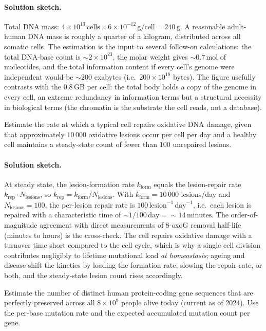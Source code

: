 \paragraph{Solution sketch.} Total DNA mass:
$4 \times 10^{13}\,\text{cells} \times 6 \times 10^{-12}\,\text{g/cell}
= 240\,\text{g}$. A reasonable adult-human DNA mass is roughly a
quarter of a kilogram, distributed across all somatic cells. The
estimation is the input to several follow-on calculations: the total
DNA-base count is $\sim 2 \times 10^{23}$, the molar weight gives
$\sim 0.7\,\text{mol}$ of nucleotides, and the total information
content if every cell's genome were independent would be $\sim 200$
exabytes (i.e.\ $200 \times 10^{18}$ bytes). The figure usefully
contrasts with the $0.8\,\text{GB}$ per cell: the total body holds
a copy of the genome in every cell, an extreme redundancy in
information terms but a structural necessity in biological terms (the
chromatin is the substrate the cell reads, not a database).

\begin{exercise}
Estimate the rate at which a typical cell repairs oxidative DNA
damage, given that approximately $10\,000$ oxidative lesions occur
per cell per day and a healthy cell maintains a steady-state count
of fewer than $100$ unrepaired lesions.
\end{exercise}

\paragraph{Solution sketch.} At steady state, the lesion-formation
rate $k_\text{form}$ equals the lesion-repair rate $k_\text{rep}
\cdot N_\text{lesions}$, so $k_\text{rep} = k_\text{form} /
N_\text{lesions}$. With $k_\text{form} = 10\,000$ lesions/day and
$N_\text{lesions} = 100$, the per-lesion repair rate is
$100\,\text{lesion}^{-1}\,\text{day}^{-1}$, i.e.\ each lesion is
repaired with a characteristic time of $\sim 1/100\,\text{day} =
\sim 14\,\text{minutes}$. The order-of-magnitude agreement with
direct measurements of 8-oxoG removal half-life (minutes to hours)
is the cross-check. The cell repairs oxidative damage with a turnover
time short compared to the cell cycle, which is why a single cell
division contributes negligibly to lifetime mutational load \emph{at
homeostasis}; ageing and disease shift the kinetics by loading the
formation rate, slowing the repair rate, or both, and the steady-state
lesion count rises accordingly.

\begin{exercise}
Estimate the number of distinct human protein-coding gene sequences
that are perfectly preserved across all $8 \times 10^9$ people alive
today (current as of 2024). Use the per-base mutation rate and the
expected accumulated mutation count per gene.
\end{exercise}

